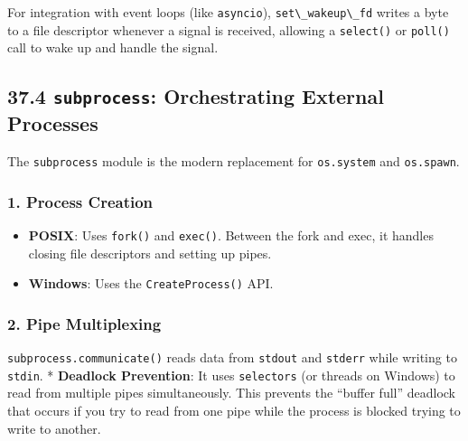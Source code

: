 For integration with event loops (like
\passthrough{\lstinline!asyncio!}),
\passthrough{\lstinline!set\_wakeup\_fd!} writes a byte to a file
descriptor whenever a signal is received, allowing a
\passthrough{\lstinline!select()!} or \passthrough{\lstinline!poll()!}
call to wake up and handle the signal.

\hypertarget{subprocess-orchestrating-external-processes}{%
\subsection{\texorpdfstring{37.4 \texttt{subprocess}: Orchestrating
External
Processes}{37.4 subprocess: Orchestrating External Processes}}\label{subprocess-orchestrating-external-processes}}

The \passthrough{\lstinline!subprocess!} module is the modern
replacement for \passthrough{\lstinline!os.system!} and
\passthrough{\lstinline!os.spawn!}.

\hypertarget{process-creation}{%
\subsubsection{1. Process Creation}\label{process-creation}}

\begin{itemize}
\tightlist
\item
  \textbf{POSIX}: Uses \passthrough{\lstinline!fork()!} and
  \passthrough{\lstinline!exec()!}. Between the fork and exec, it
  handles closing file descriptors and setting up pipes.
\item
  \textbf{Windows}: Uses the \passthrough{\lstinline!CreateProcess()!}
  API.
\end{itemize}

\hypertarget{pipe-multiplexing}{%
\subsubsection{2. Pipe Multiplexing}\label{pipe-multiplexing}}

\passthrough{\lstinline!subprocess.communicate()!} reads data from
\passthrough{\lstinline!stdout!} and \passthrough{\lstinline!stderr!}
while writing to \passthrough{\lstinline!stdin!}. * \textbf{Deadlock
Prevention}: It uses \passthrough{\lstinline!selectors!} (or threads on
Windows) to read from multiple pipes simultaneously. This prevents the
``buffer full'' deadlock that occurs if you try to read from one pipe
while the process is blocked trying to write to another.

